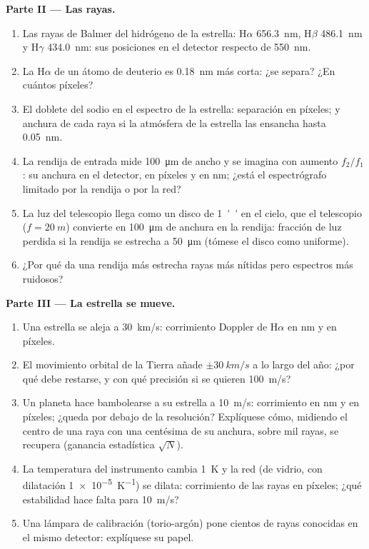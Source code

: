 \begin{problem}
\medskip
\noindent\textbf{Parte II --- Las rayas.}
\begin{enumerate}[resume]
  \item Las rayas de Balmer del hidrógeno de la estrella: H$\alpha$ \qty{656.3}{nm},
        H$\beta$ \qty{486.1}{nm} y H$\gamma$ \qty{434.0}{nm}: sus posiciones en el
        detector respecto de \qty{550}{nm}.
  \item La H$\alpha$ de un átomo de deuterio es \qty{0.18}{nm} más corta: ¿se separa?
        ¿En cuántos píxeles?
  \item El doblete del sodio en el espectro de la estrella: separación en
        píxeles; y anchura de cada raya si la atmósfera de la estrella
        las ensancha hasta \qty{0.05}{nm}.
  \item La rendija de entrada mide \qty{100}{\micro m} de ancho y se imagina con
        aumento $f_2/f_1$: su anchura en el detector, en píxeles y
        en nm; ¿está el espectrógrafo limitado por la rendija o por la red?
  \item La luz del telescopio llega como un disco de \qty{1}{''} en
        el cielo, que el telescopio ($f = \qty{20}{m}$) convierte en \qty{100}{\micro m}
        de anchura en la rendija: fracción de luz perdida si la rendija se
        estrecha a \qty{50}{\micro m} (tómese el disco como uniforme).
  \item ¿Por qué da una rendija más estrecha rayas más nítidas pero espectros
        más ruidosos?
\end{enumerate}

\medskip
\noindent\textbf{Parte III --- La estrella se mueve.}
\begin{enumerate}[resume]
  \item Una estrella se aleja a \qty{30}{km/s}: corrimiento Doppler de H$\alpha$ en nm
        y en píxeles.
  \item El movimiento orbital de la Tierra añade $\pm\qty{30}{km/s}$ a lo largo del año:
        ¿por qué debe restarse, y con qué precisión si se quieren
        \qty{100}{m/s}?
  \item Un planeta hace bambolearse a su estrella a \qty{10}{m/s}: corrimiento en nm y
        en píxeles; ¿queda por debajo de la resolución? Explíquese cómo, midiendo
        el centro de una raya con una centésima de su anchura, sobre
        mil rayas, se recupera (ganancia estadística $\sqrt{N}$).
  \item La temperatura del instrumento cambia \qty{1}{K} y la
        red (de vidrio, con dilatación \qty{1e-5}{K^{-1}}) se dilata: corrimiento de las
        rayas en píxeles; ¿qué estabilidad hace falta para \qty{10}{m/s}?
  \item Una lámpara de calibración (torio-argón) pone cientos de rayas conocidas
        en el mismo detector: explíquese su papel.
\end{enumerate}


\end{problem}
